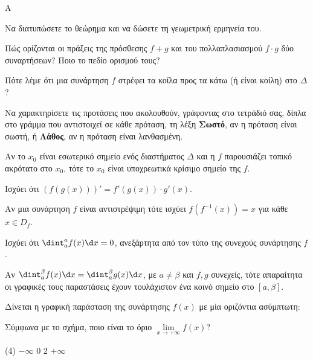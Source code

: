 \begin{thema}{A}
\begin{erwthma}
    \item Να διατυπώσετε το θεώρημα  και να δώσετε τη γεωμετρική ερμηνεία του.
    \item Πώς ορίζονται οι πράξεις της πρόσθεσης $f+g$ και του πολλαπλασιασμού $f \cdot g$ δύο συναρτήσεων? Ποιο το πεδίο ορισμού τους?
    \item Πότε λέμε ότι μια συνάρτηση $f$ στρέφει τα κοίλα προς τα κάτω (ή είναι κοίλη) στο $\Delta$?
    \item Να χαρακτηρίσετε τις προτάσεις που ακολουθούν, γράφοντας στο τετράδιό σας, δίπλα στο γράμμα που αντιστοιχεί σε κάθε πρόταση, τη λέξη \textbf{Σωστό}, αν η πρόταση είναι σωστή, ή \textbf{Λάθος}, αν η πρόταση είναι λανθασμένη.
    \begin{alist}
        \item Αν το $x_0$ είναι εσωτερικό σημείο ενός διαστήματος $\Delta$ και η $f$ παρουσιάζει τοπικό ακρότατο στο $x_0$, τότε το $x_0$ είναι υποχρεωτικά κρίσιμο σημείο της $f$.
        \item Ισχύει ότι $(f(g(x)))' = f'(g(x)) \cdot g'(x)$.
        \item Αν μια συνάρτηση $f$ είναι αντιστρέψιμη τότε ισχύει $f(f^{-1}(x))=x$ για κάθε $x\in D_f$.
        \item Ισχύει ότι $\dint_{a}^{a} f(x) \d x = 0$, ανεξάρτητα από τον τύπο της συνεχούς συνάρτησης $f$.
        \item Αν $\dint_a^\beta f(x) \d x = \dint_a^\beta g(x) \d x$, με $a \ne \beta$ και $f,g$ συνεχείς, τότε απαραίτητα οι γραφικές τους παραστάσεις έχουν τουλάχιστον ένα κοινό σημείο στο $[a, \beta]$.
    \end{alist}
    \item Δίνεται η γραφική παράσταση της συνάρτησης $f(x)$ με μία οριζόντια ασύμπτωτη:
    \begin{center}
    \end{center}
    Σύμφωνα με το σχήμα, ποιο είναι το όριο $\lim\limits_{x\to +\infty} f(x)$?
    \begin{tasks}[label=\let\textdexiakeraia\relax\alph*.](4)
        \task $-\infty$
        \task $0$
        \task $2$
        \task $+\infty$
    \end{tasks}
\end{erwthma}
\end{thema}


